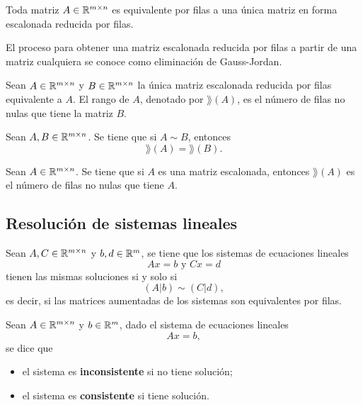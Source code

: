 \documentclass[a4,11pt]{aleph-notas}
\begin{document}
\begin{teo}
    Toda matriz $A\in\Mat[\R]{m}{n}$ es equivalente por filas a una única matriz en forma escalonada reducida por filas. 
\end{teo}

\begin{advertencia}
    El proceso para obtener una matriz escalonada reducida por filas a partir de una matriz cualquiera se conoce como eliminación de Gauss-Jordan.
\end{advertencia}

\begin{defi}
    Sean $A\in\Mat[\R]{m}{n}$ y $B\in\Mat[\R]{m}{n}$ la única matriz escalonada reducida por filas equivalente a $A$. El rango de $A$, denotado por $\rang(A)$, es el número de filas no nulas que tiene la matriz $B$.  
\end{defi}

\begin{prop}
    Sean $A, B\in\Mat[\R]{m}{n}$. Se tiene que si $A\sim B$, entonces 
    \[
        \rang(A) = \rang(B).
    \]
\end{prop}

\begin{prop}
    Sean $A\in\Mat[\R]{m}{n}$. Se tiene que si $A$ es una matriz escalonada, entonces $\rang(A)$ es el número de filas no nulas que tiene $A$.
\end{prop}

\subsection{Resolución de sistemas lineales}

\begin{teo}
    Sean $A,C\in \Mat[\R]{m}{n}$ y $b,d\in \R^m$, se tiene que los sistemas de ecuaciones lineales
    \[
        Ax=b
        \text{ y }
        Cx=d
    \]
    tienen las mismas soluciones si y solo si
    \[
        (A|b)\sim (C|d),
    \]
    es decir, si las matrices aumentadas de los sistemas son equivalentes por filas. 
\end{teo}


\begin{defi}
    Sean $A\in \Mat[\R]{m}{n}$ y $b\in \R^m$, dado el sistema de ecuaciones lineales
    \[
        Ax=b,
    \]
    se dice que
    \begin{itemize}
    \item
        el sistema es \textbf{inconsistente} si no tiene solución;
    \item
        el sistema es \textbf{consistente} si tiene solución.
    \end{itemize}
\end{defi}
\end{document}
